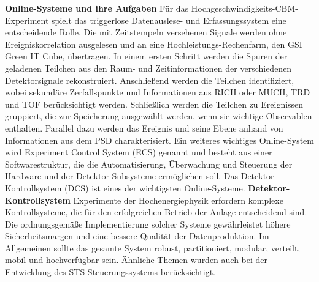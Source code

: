 \bigbreak
\textbf{Online-Systeme und ihre Aufgaben}
\bigbreak
Für das Hochgeschwindigkeits-CBM-Experiment spielt das triggerlose Datenauslese- und Erfassungssystem eine entscheidende Rolle. Die mit Zeitstempeln versehenen Signale werden ohne Ereigniskorrelation ausgelesen und an eine Hochleistungs-Rechenfarm, den GSI Green IT Cube, übertragen.
In einem ersten Schritt werden die Spuren der geladenen Teilchen aus den Raum- und Zeitinformationen der verschiedenen Detektorsignale rekonstruiert. Anschließend werden die Teilchen identifiziert, wobei sekundäre Zerfallspunkte und Informationen aus RICH oder MUCH, TRD und TOF berücksichtigt werden. Schließlich werden die Teilchen zu Ereignissen gruppiert, die zur Speicherung ausgewählt werden, wenn sie wichtige Observablen enthalten. Parallel dazu werden das Ereignis und seine Ebene anhand von Informationen aus dem PSD charakterisiert.
Ein weiteres wichtiges Online-System wird Experiment Control System (ECS) genannt und besteht aus einer Softwarestruktur, die die Automatisierung, Überwachung und Steuerung der Hardware und der Detektor-Subsysteme ermöglichen soll. Das Detektor-Kontrollsystem (DCS) ist eines der wichtigsten Online-Systeme. 
\bigbreak
\textbf{Detektor-Kontrollsystem}
\bigbreak
Experimente der Hochenergiephysik erfordern komplexe Kontrollsysteme, die für den erfolgreichen Betrieb der Anlage entscheidend sind. Die ordnungsgemäße Implementierung solcher Systeme gewährleistet höhere Sicherheitsmargen und eine bessere Qualität der Datenproduktion. Im Allgemeinen sollte das gesamte System robust, partitioniert, modular, verteilt, mobil und hochverfügbar sein. Ähnliche Themen wurden auch bei der Entwicklung des \gls{STS}-Steuerungssystems berücksichtigt.


